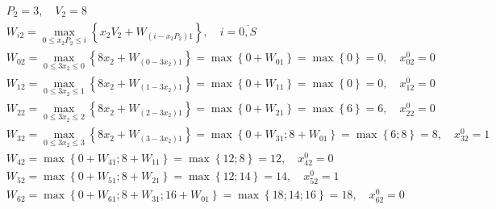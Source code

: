 \begin{align*}
     & P_2 = 3, \quad V_2 = 8                                                                                                                                                          \\
     & W_{i2} = \max\limits_{0 \leq x_2P_2 \leq i} \left\{x_2V_2 + W_{(i - x_2P_2)1}\right\}, \quad i = \overline{0, S}                                                                \\
     & W_{02} = \max\limits_{0 \leq 3x_2 \leq 0} \left\{8x_2 + W_{(0 - 3x_2)1}\right\} = \max \left\{0 + W_{01}\right\} = \max \left\{0\right\} = 0, \quad x_{02}^0 = 0                \\
     & W_{12} = \max\limits_{0 \leq 3x_2 \leq 1} \left\{8x_2 + W_{(1 - 3x_2)1}\right\} = \max \left\{0 + W_{11}\right\} = \max \left\{0\right\} = 0, \quad x_{12}^0 = 0                \\
     & W_{22} = \max\limits_{0 \leq 3x_2 \leq 2} \left\{8x_2 + W_{(2 - 3x_2)1}\right\} = \max \left\{0 + W_{21}\right\} = \max \left\{6\right\} = 6, \quad x_{22}^0 = 0                \\
     & W_{32} = \max\limits_{0 \leq 3x_2 \leq 3} \left\{8x_2 + W_{(3 - 3x_2)1}\right\} = \max \left\{0 + W_{31}; 8 + W_{01}\right\} = \max \left\{6; 8\right\} = 8, \quad x_{32}^0 = 1 \\
     & W_{42} = \max \left\{0 + W_{41}; 8 + W_{11}\right\} = \max \left\{12; 8\right\} = 12, \quad x_{42}^0 = 0                                                                        \\
     & W_{52} = \max \left\{0 + W_{51}; 8 + W_{21}\right\} = \max \left\{12; 14\right\} = 14, \quad x_{52}^0 = 1                                                                       \\
     & W_{62} = \max \left\{0 + W_{61}; 8 + W_{31}; 16 + W_{01}\right\} = \max \left\{18; 14; 16\right\} = 18, \quad x_{62}^0 = 0                                                      \\
\end{align*}
